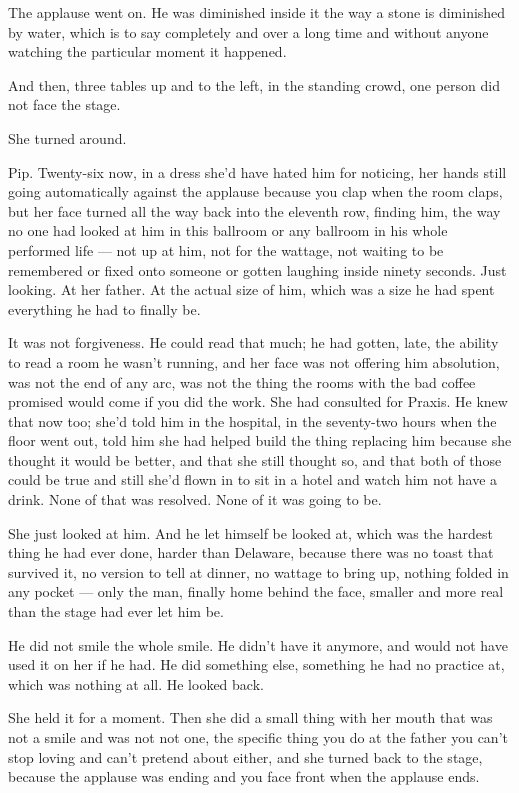 \documentclass[11pt,openany]{book}
\begin{document}
The applause went on. He was diminished inside it the way a stone is diminished by water, which is to say completely and over a long time and without anyone watching the particular moment it happened.

And then, three tables up and to the left, in the standing crowd, one person did not face the stage.

She turned around.

Pip. Twenty-six now, in a dress she'd have hated him for noticing, her hands still going automatically against the applause because you clap when the room claps, but her face turned all the way back into the eleventh row, finding him, the way no one had looked at him in this ballroom or any ballroom in his whole performed life --- not up at him, not for the wattage, not waiting to be remembered or fixed onto someone or gotten laughing inside ninety seconds. Just looking. At her father. At the actual size of him, which was a size he had spent everything he had to finally be.

It was not forgiveness. He could read that much; he had gotten, late, the ability to read a room he wasn't running, and her face was not offering him absolution, was not the end of any arc, was not the thing the rooms with the bad coffee promised would come if you did the work. She had consulted for Praxis. He knew that now too; she'd told him in the hospital, in the seventy-two hours when the floor went out, told him she had helped build the thing replacing him because she thought it would be better, and that she still thought so, and that both of those could be true and still she'd flown in to sit in a hotel and watch him not have a drink. None of that was resolved. None of it was going to be.

She just looked at him. And he let himself be looked at, which was the hardest thing he had ever done, harder than Delaware, because there was no toast that survived it, no version to tell at dinner, no wattage to bring up, nothing folded in any pocket --- only the man, finally home behind the face, smaller and more real than the stage had ever let him be.

He did not smile the whole smile. He didn't have it anymore, and would not have used it on her if he had. He did something else, something he had no practice at, which was nothing at all. He looked back.

She held it for a moment. Then she did a small thing with her mouth that was not a smile and was not not one, the specific thing you do at the father you can't stop loving and can't pretend about either, and she turned back to the stage, because the applause was ending and you face front when the applause ends.
\end{document}
